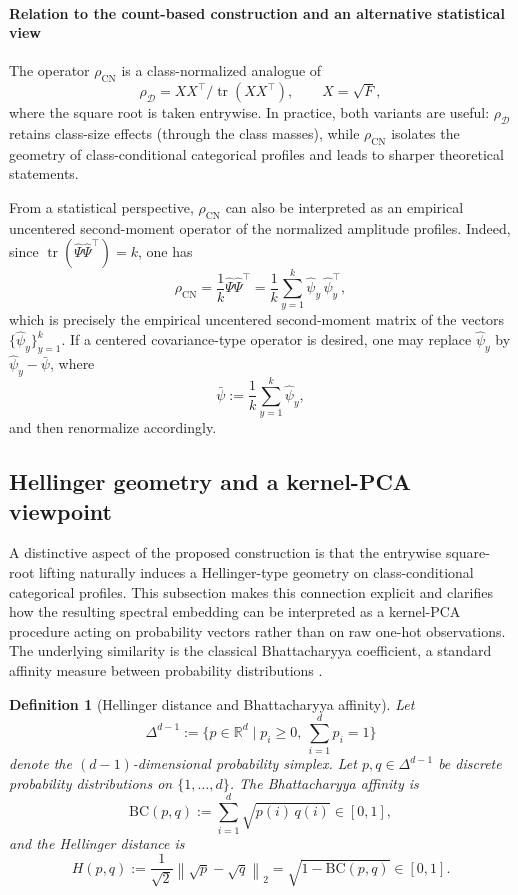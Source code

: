 \documentclass[preprint,11pt]{elsarticle}
\newtheorem{Definition}[Theorem]{Definition}
\newcommand{\tr}{\operatorname{tr}}
\begin{document}
\paragraph{Relation to the count-based construction and an alternative statistical view}
The operator $\rho_{\mathrm{CN}}$ is a class-normalized analogue of
\[
\rho_{\mathcal D}=XX^\top/\tr(XX^\top),\qquad X=\sqrt{F},
\]
where the square root is taken entrywise.
In practice, both variants are useful: $\rho_{\mathcal D}$ retains class-size effects (through the class masses), while $\rho_{\mathrm{CN}}$
isolates the geometry of class-conditional categorical profiles and leads to sharper theoretical statements.

From a statistical perspective, $\rho_{\mathrm{CN}}$ can also be interpreted as an empirical uncentered second-moment operator of the normalized amplitude profiles.
Indeed, since $\tr(\widehat\Psi\widehat\Psi^\top)=k$, one has
\[
\rho_{\mathrm{CN}}
=
\frac{1}{k}\widehat\Psi\widehat\Psi^\top
=
\frac{1}{k}\sum_{y=1}^k \widehat\psi_y\,\widehat\psi_y^\top,
\]
which is precisely the empirical uncentered second-moment matrix of the vectors $\{\widehat\psi_y\}_{y=1}^k$.
If a centered covariance-type operator is desired, one may replace $\widehat\psi_y$ by $\widehat\psi_y-\bar\psi$, where
\[
\bar\psi:=\frac{1}{k}\sum_{y=1}^k \widehat\psi_y,
\]
and then renormalize accordingly.

\subsection{Hellinger geometry and a kernel-PCA viewpoint}
\label{subsec:hellinger_kernel_pca}

A distinctive aspect of the proposed construction is that the entrywise square-root lifting naturally induces a
Hellinger-type geometry on class-conditional categorical profiles. This subsection makes this connection explicit and
clarifies how the resulting spectral embedding can be interpreted as a kernel-PCA procedure acting on probability
vectors rather than on raw one-hot observations. The underlying similarity is the classical Bhattacharyya coefficient,
a standard affinity measure between probability distributions \cite{Bhattacharyya1943,Aherne1998}.

\begin{Definition}[Hellinger distance and Bhattacharyya affinity]
\label{def:hellinger_bhattacharyya}
Let
\[
\Delta^{d-1}
:= \Big\{ p \in \mathbb{R}^d \;\big|\; p_i \ge 0,\ \sum_{i=1}^d p_i = 1 \Big\}
\]
denote the \((d-1)\)-dimensional probability simplex. Let $p,q\in\Delta^{d-1}$ be discrete probability distributions on $\{1,\dots,d\}$.
The \emph{Bhattacharyya affinity} is
\[
\mathrm{BC}(p,q) := \sum_{i=1}^d \sqrt{p(i)\,q(i)} \in [0,1],
\]
and the \emph{Hellinger distance} is
\[
H(p,q) := \frac{1}{\sqrt{2}}\left\|\sqrt{p}-\sqrt{q}\right\|_2
= \sqrt{1-\mathrm{BC}(p,q)} \in [0,1].
\]
\end{Definition}
\end{document}
